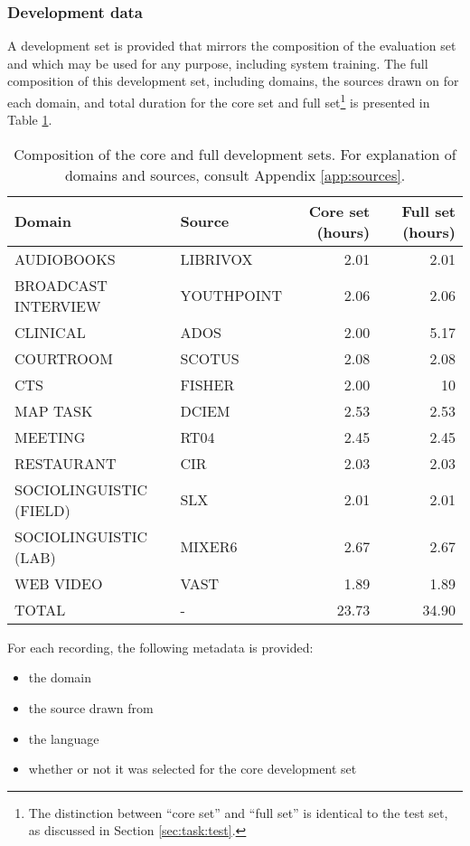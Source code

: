 \documentclass{article}
\begin{document}
\subsubsection{Development data}
A development set is provided that mirrors the composition of the evaluation set and which may be used for any purpose, including system training. The full composition of this development set, including domains, the sources drawn on for each domain, and total duration for the core set and full set\footnote{The distinction between ``core set'' and ``full set'' is identical to the test set, as discussed in Section \ref{sec:task:test}.} is presented in Table \ref{tab:single_chan_dev_set}.
%
\begin{table}[H]
    \centering
        \begin{tabular}{llrr}
        \hline
         {\bf Domain}       & {\bf Source} &  {\bf Core set (hours)} &   {\bf Full set (hours)} \\
        \hline
         AUDIOBOOKS          & LIBRIVOX   &  2.01 &       2.01 \\
         BROADCAST INTERVIEW & YOUTHPOINT &  2.06 &       2.06 \\
         CLINICAL            & ADOS       &  2.00 &       5.17 \\
         COURTROOM           & SCOTUS     &  2.08 &       2.08 \\
         CTS                 & FISHER     &  2.00   &  10 \\
         MAP TASK             & DCIEM      &  2.53 &      2.53 \\
         MEETING             & RT04       &  2.45 &       2.45 \\
        RESTAURANT                 & CIR        &  2.03 &       2.03 \\
         SOCIOLINGUISTIC (FIELD)         & SLX        &  2.01 &       2.01 \\
         SOCIOLINGUISTIC (LAB)           & MIXER6     &  2.67 &       2.67 \\
         WEB VIDEO            & VAST       &  1.89 &       1.89 \\
         \hline
         TOTAL               & -          & 23.73   &      34.90 \\
        \hline
        \end{tabular}
    \caption{Composition of the core and full development sets. For explanation of domains and sources, consult Appendix \ref{app:sources}.}
    \label{tab:single_chan_dev_set}
\end{table}
%
For each recording, the following metadata is provided:
    \begin{itemize}
        \item the domain
        \item the source drawn from
        \item the language
        \item whether or not it was selected for the core development set
    \end{itemize}
\end{document}
